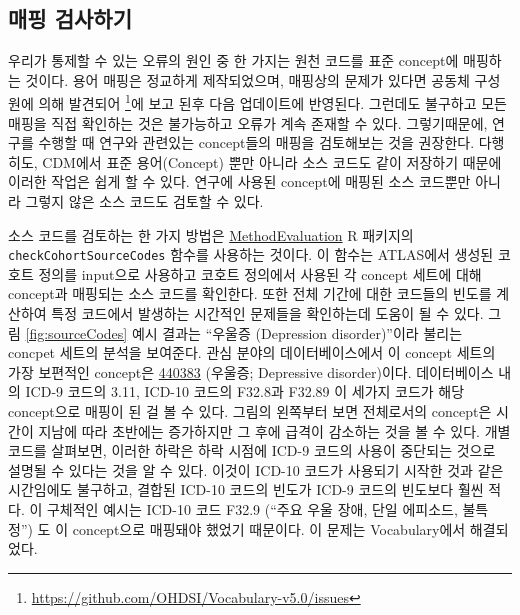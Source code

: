 \documentclass[11pt]{book}
\let\rmarkdownfootnote\footnote%
\def\footnote{\protect\rmarkdownfootnote}
\theoremstyle{definition}
\theoremstyle{definition}
\theoremstyle{definition}
\theoremstyle{remark}
\begin{document}
\subsection{매핑 검사하기}\label{-}

우리가 통제할 수 있는 오류의 원인 중 한 가지는 원천 코드를 표준
concept에 매핑하는 것이다. 용어 매핑은 정교하게 제작되었으며, 매핑상의
문제가 있다면 공동체 구성원에 의해 발견되어 \footnote{\url{https://github.com/OHDSI/Vocabulary-v5.0/issues}}에
보고 된후 다음 업데이트에 반영된다. 그런데도 불구하고 모든 매핑을 직접
확인하는 것은 불가능하고 오류가 계속 존재할 수 있다. 그렇기때문에,
연구를 수행할 때 연구와 관련있는 concept들의 매핑을 검토해보는 것을
권장한다. 다행히도, CDM에서 표준 용어(Concept) 뿐만 아니라 소스 코드도
같이 저장하기 때문에 이러한 작업은 쉽게 할 수 있다. 연구에 사용된
concept에 매핑된 소스 코드뿐만 아니라 그렇지 않은 소스 코드도 검토할 수
있다.

소스 코드를 검토하는 한 가지 방법은
\href{https://ohdsi.github.io/MethodEvaluation/}{MethodEvaluation} R
패키지의 \texttt{checkCohortSourceCodes} 함수를 사용하는 것이다. 이
함수는 ATLAS에서 생성된 코호트 정의를 input으로 사용하고 코호트 정의에서
사용된 각 concept 세트에 대해 concept과 매핑되는 소스 코드를 확인한다.
또한 전체 기간에 대한 코드들의 빈도를 계산하여 특정 코드에서 발생하는
시간적인 문제들을 확인하는데 도움이 될 수 있다. 그림
\ref{fig:sourceCodes} 예시 결과는 ``우울증 (Depression disorder)''이라
불리는 concpet 세트의 분석을 보여준다. 관심 분야의 데이터베이스에서 이
concept 세트의 가장 보편적인 concept은
\href{http://athena.ohdsi.org/search-terms/terms/440383}{440383}
(우울증; Depressive disorder)이다. 데이터베이스 내의 ICD-9 코드의 3.11,
ICD-10 코드의 F32.8과 F32.89 이 세가지 코드가 해당 concept으로 매핑이 된
걸 볼 수 있다. 그림의 왼쪽부터 보면 전체로서의 concept은 시간이 지남에
따라 초반에는 증가하지만 그 후에 급격이 감소하는 것을 볼 수 있다. 개별
코드를 살펴보면, 이러한 하락은 하락 시점에 ICD-9 코드의 사용이 중단되는
것으로 설명될 수 있다는 것을 알 수 있다. 이것이 ICD-10 코드가 사용되기
시작한 것과 같은 시간임에도 불구하고, 결합된 ICD-10 코드의 빈도가 ICD-9
코드의 빈도보다 훨씬 적다. 이 구체적인 예시는 ICD-10 코드 F32.9 (``주요
우울 장애, 단일 에피소드, 불특정'') 도 이 concept으로 매핑돼야 했었기
때문이다. 이 문제는 Vocabulary에서 해결되었다.
\end{document}
